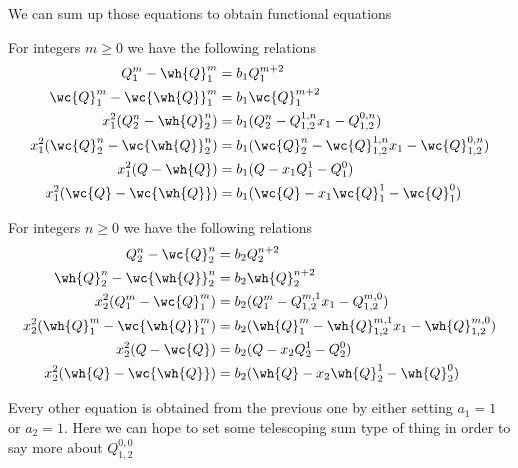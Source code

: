 We can sum up those equations to obtain functional equations
\begin{corollary} For integers $m \ge 0$ we have the following relations
\begin{align*}
Q_1^m - \wh{Q}_1^m &= b_1 Q_1^{m+2}\\
\wc{Q}_1^m - \wc{\wh{Q}}_1^m &= b_1 \wc{Q}_1^{m+2}\\
x_1^2(Q_2^n-\wh{Q}_2^n) &= b_1 (Q_2^n - Q_{1,2}^{1,n}x_1 - Q_{1,2}^{0,n})\\
x_1^2(\wc{Q}_2^n-\wc{\wh{Q}}_2^n) &= b_1 (\wc{Q}_2^n - \wc{Q}_{1,2}^{1,n}x_1 - \wc{Q}_{1,2}^{0,n})\\
x_1^2(Q-\wh{Q}) &= b_1(Q-x_1Q_1^1-Q_1^0)\\
x_1^2(\wc{Q}-\wc{\wh{Q}}) &= b_1(\wc{Q}-x_1\wc{Q}_1^1-\wc{Q}_1^0)
\end{align*}
\end{corollary}

\begin{corollary} For integers $n \ge 0$ we have the following relations
\begin{align*}
Q_2^n-\wc{Q}_2^n &= b_2 Q_2^{n+2}\\
\wh{Q}_2^n-\wc{\wh{Q}}_2^n &= b_2 \wh{Q}_2^{n+2}\\
x_2^2(Q_1^m-\wc{Q}_1^m) &=  b_2 (Q_1^m - Q_{1,2}^{m,1}x_1 - Q_{1,2}^{m,0})\\
x_2^2(\wh{Q}_1^m-\wc{\wh{Q}}_1^m) &=  b_2 (\wh{Q}_1^m - \wh{Q}_{1,2}^{m,1}x_1 - \wh{Q}_{1,2}^{m,0})\\
x_2^2(Q-\wc{Q}) &= b_2(Q-x_2Q_2^1-Q_2^0)\\
x_2^2(\wh{Q}-\wc{\wh{Q}}) &= b_2(\wh{Q}-x_2\wh{Q}_2^1-\wh{Q}_2^0)
\end{align*}
\end{corollary}
Every other equation is obtained from the previous one by either setting $a_1 = 1$ or $a_2 = 1$. Here we can hope to set some telescoping sum type of thing in order to say more about $Q_{1,2}^{0,0}$

